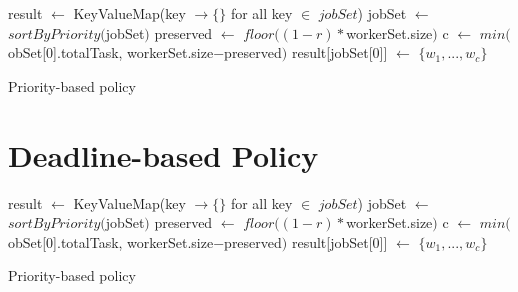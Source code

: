 \begin{algorithm}
  \DontPrintSemicolon %
  result $\gets$ KeyValueMap(key $\to \{\}$ for all key $\in$ $jobSet$)\;
  jobSet $\gets$ $sortByPriority($jobSet$)$\;
  preserved $\gets$ $floor((1-r) * $workerSet.size$)$\;
  c $\gets$ $min($obSet[0].totalTask, workerSet.size$-$preserved$)$\;
  result[jobSet[0]] $\gets$ $\{w_1, ..., w_c\}$\;
  \;
  \caption{Priority-based policy}
  \label{algo:naive-priority-based}
\end{algorithm}


\section{Deadline-based Policy}

\begin{algorithm}
  \DontPrintSemicolon %
  result $\gets$ KeyValueMap(key $\to \{\}$ for all key $\in$ $jobSet$)\;
  jobSet $\gets$ $sortByPriority($jobSet$)$\;
  preserved $\gets$ $floor((1-r) * $workerSet.size$)$\;
  c $\gets$ $min($obSet[0].totalTask, workerSet.size$-$preserved$)$\;
  result[jobSet[0]] $\gets$ $\{w_1, ..., w_c\}$\;
  \;
  \caption{Priority-based policy}
  \label{algo:naive-priority-based}
\end{algorithm}
